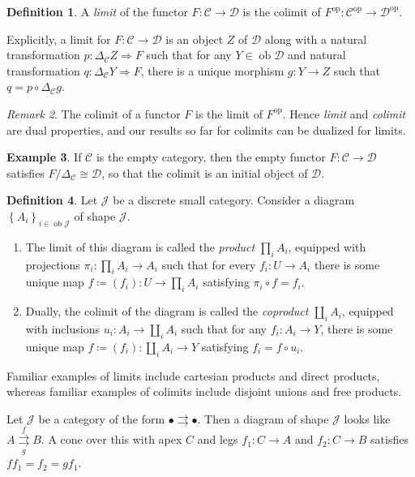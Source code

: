 \documentclass[10pt,letterpaper,cm]{nupset}
\theoremstyle{definition}
\newtheorem{definition}{Definition}[section]
\newtheorem{exmp}[definition]{Example}
\theoremstyle{theorem}
\theoremstyle{remark}
\newtheorem{remark}[definition]{Remark}
\newcommand{\1}{\mathbf{1}}
\renewcommand{\c}{\mathscr{C}}
\renewcommand{\d}{\mathscr{D}}
\renewcommand{\j}{\mathscr{J}}
\newcommand{\0}{\vec 0}
\DeclareMathOperator{\op}{op}
\DeclareMathOperator{\ob}{ob}
\begin{document}
\begin{definition}
A \textit{limit} of the functor $F: \c \to \d$ is  the colimit of $F^{\op} : \c^{\op} \to \d^{\op}$.
\end{definition}


Explicitly,  a limit for $F: \c \to \d$ is an object $Z$ of $\d$ along with a natural transformation $p: \Delta_{\c}Z \Rightarrow F$ such that for any $Y \in \ob \d$ and natural transformation $q: \Delta_{\c}Y \Rightarrow F$, there is a unique morphism $g: Y \to Z$ such that $ q= p \circ \Delta_{\c}g$.


\begin{remark}
The colimit of a functor $F$ is the limit of $F^{\op}$. Hence \textit{limit} and \textit{colimit} are dual properties, and our results so far for colimits can be dualized  for limits.
\end{remark}

\begin{exmp}
If $\c$ is the empty category, then the empty functor $F: \c \to \d$ satisfies $F/\Delta_{\c}\cong \d$, so that the colimit is an initial object of $\d$.
\end{exmp}

\begin{definition}
Let $\j$ be a discrete small category. Consider a diagram  $\left\{A_i\right\}_{i\in \ob{\j}}$ of shape $\j$. 
\begin{enumerate}
\item The limit of this diagram is called the \textit{product} $\prod_i A_i$, equipped with projections $\pi_i : \prod_i A_i \to A_i$ such that for every $f_{i} : U \to A_i$ there is some unique map $f\coloneqq \left(f_i\right) : U \to \prod_i A_i$ satisfying $\pi_i \circ f = f_i$. 
\item  Dually, the colimit of the diagram is called the \textit{coproduct} $\coprod_i A_i$, equipped with inclusions $u_i : A_i \to \coprod_i A_i$ such that for any $f_i : A_i \to Y$, there is some unique map $f\coloneqq \left(f_i\right) : \coprod_i A_i \to Y$ satisfying $f_i = f \circ u_i$.
\end{enumerate}
\end{definition}

\smallskip

Familiar examples of limits include cartesian products and direct products, whereas familiar examples of colimits include disjoint unions and free products. 


\smallskip

Let $\j$ be a category of the form $\bullet \rightrightarrows \bullet$. Then  a diagram of shape $\j$ looks like $A \overset{f}{\underset{g}{\rightrightarrows}} B$. A cone over this with apex $C$ and legs $f_1 : C \to A$ and $f_2 : C \to B$ satisfies $ff_1=f_2 = gf_1$.
\end{document}

